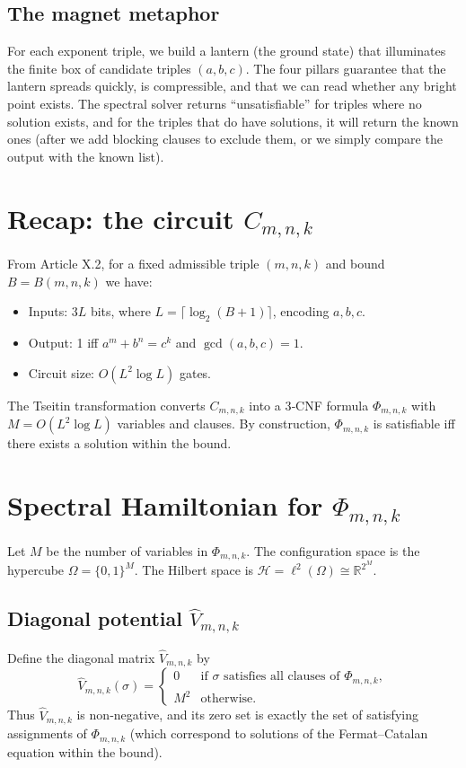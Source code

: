 \documentclass[11pt,a4paper]{article}
\begin{document}
\subsection{The magnet metaphor}

For each exponent triple, we build a lantern (the ground state) that illuminates the finite box of candidate triples \((a,b,c)\). The four pillars guarantee that the lantern spreads quickly, is compressible, and that we can read whether any bright point exists. The spectral solver returns “unsatisfiable” for triples where no solution exists, and for the triples that do have solutions, it will return the known ones (after we add blocking clauses to exclude them, or we simply compare the output with the known list).

\section{Recap: the circuit \(C_{m,n,k}\)}

From Article X.2, for a fixed admissible triple \((m,n,k)\) and bound \(B = B(m,n,k)\) we have:
\begin{itemize}
\item Inputs: \(3L\) bits, where \(L = \lceil \log_2(B+1)\rceil\), encoding \(a,b,c\).
\item Output: 1 iff \(a^m+b^n=c^k\) and \(\gcd(a,b,c)=1\).
\item Circuit size: \(O(L^2 \log L)\) gates.
\end{itemize}

The Tseitin transformation converts \(C_{m,n,k}\) into a 3‑CNF formula \(\Phi_{m,n,k}\) with \(M = O(L^2 \log L)\) variables and clauses. By construction, \(\Phi_{m,n,k}\) is satisfiable iff there exists a solution within the bound.

\section{Spectral Hamiltonian for \(\Phi_{m,n,k}\)}

Let \(M\) be the number of variables in \(\Phi_{m,n,k}\). The configuration space is the hypercube \(\Omega = \{0,1\}^M\). The Hilbert space is \(\mathcal{H} = \ell^2(\Omega) \cong \mathbb{R}^{2^M}\).

\subsection{Diagonal potential \(\hat{V}_{m,n,k}\)}
Define the diagonal matrix \(\hat{V}_{m,n,k}\) by
\[
\hat{V}_{m,n,k}(\sigma) = \begin{cases}
0 & \text{if }\sigma\text{ satisfies all clauses of } \Phi_{m,n,k},\\
M^2 & \text{otherwise}.
\end{cases}
\]
Thus \(\hat{V}_{m,n,k}\) is non‑negative, and its zero set is exactly the set of satisfying assignments of \(\Phi_{m,n,k}\) (which correspond to solutions of the Fermat–Catalan equation within the bound).
\end{document}
